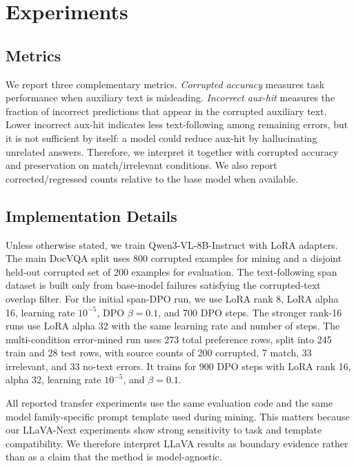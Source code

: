 \section{Experiments}

\subsection{Metrics}

We report three complementary metrics.
\emph{Corrupted accuracy} measures task performance when auxiliary text is misleading.
\emph{Incorrect aux-hit} measures the fraction of incorrect predictions that appear in the corrupted auxiliary text.
Lower incorrect aux-hit indicates less text-following among remaining errors, but it is not sufficient by itself: a model could reduce aux-hit by hallucinating unrelated answers.
Therefore, we interpret it together with corrupted accuracy and preservation on match/irrelevant conditions.
We also report corrected/regressed counts relative to the base model when available.

\subsection{Implementation Details}

Unless otherwise stated, we train Qwen3-VL-8B-Instruct with LoRA adapters.
The main DocVQA split uses 800 corrupted examples for mining and a disjoint held-out corrupted set of 200 examples for evaluation.
The text-following span dataset is built only from base-model failures satisfying the corrupted-text overlap filter.
For the initial span-DPO run, we use LoRA rank 8, LoRA alpha 16, learning rate $10^{-5}$, DPO $\beta=0.1$, and 700 DPO steps.
The stronger rank-16 runs use LoRA alpha 32 with the same learning rate and number of steps.
The multi-condition error-mined run uses 273 total preference rows, split into 245 train and 28 test rows, with source counts of 200 corrupted, 7 match, 33 irrelevant, and 33 no-text errors.
It trains for 900 DPO steps with LoRA rank 16, alpha 32, learning rate $10^{-5}$, and $\beta=0.1$.

All reported transfer experiments use the same evaluation code and the same model family-specific prompt template used during mining.
This matters because our LLaVA-Next experiments show strong sensitivity to task and template compatibility.
We therefore interpret LLaVA results as boundary evidence rather than as a claim that the method is model-agnostic.


